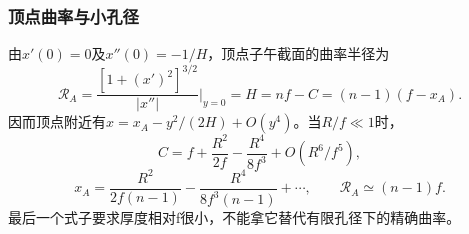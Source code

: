 \documentclass[UTF8,fontset=fandol,a4paper,11pt]{ctexart}
\begin{document}
\subsubsection*{顶点曲率与小孔径}
由$x'(0)=0$及$x''(0)=-1/H$，顶点子午截面的曲率半径为
\[
\mathcal R_A=\frac{[1+(x')^2]^{3/2}}{|x''|}\bigg|_{y=0}
=H=nf-C=(n-1)(f-x_A).
\]
因而顶点附近有$x=x_A-y^2/(2H)+O(y^4)$。当$R/f\ll1$时，
\[
C=f+\frac{R^2}{2f}-\frac{R^4}{8f^3}+O(R^6/f^5),
\]
\[
x_A=\frac{R^2}{2f(n-1)}
-\frac{R^4}{8f^3(n-1)}+\cdots,\qquad
\mathcal R_A\simeq(n-1)f.
\]
最后一个式子要求厚度相对f很小，不能拿它替代有限孔径下的精确曲率。
\begin{center}\begin{minipage}{.98\linewidth}\centering
{}
\end{minipage}
\end{center}
\end{document}
